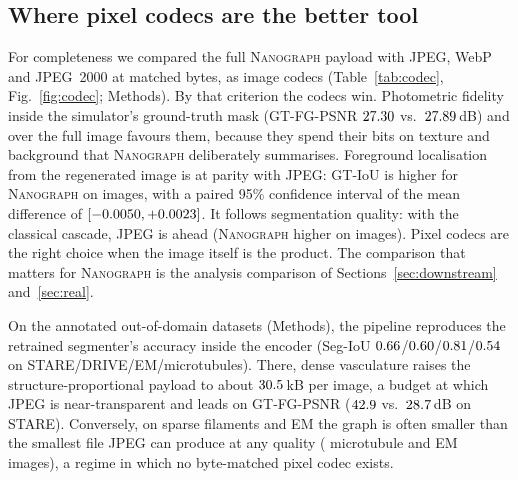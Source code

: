 \documentclass[10pt,a4paper]{article}
\newcommand{\method}{\textnormal{\textsc{Nanograph}}\xspace}
\begin{document}
\subsection{Where pixel codecs are the better tool}
\label{sec:codec}
For completeness we compared the full \method payload with JPEG, WebP and
JPEG~2000 at matched bytes, as image codecs (Table~\ref{tab:codec},
Fig.~\ref{fig:codec}; Methods). By that criterion the codecs win. Photometric fidelity inside the
simulator's ground-truth mask (GT-FG-PSNR $27.30$ vs.\
$27.89$\,dB) and over the full image favours them, because they
spend their bits on texture and background that \method deliberately
summarises. Foreground localisation from the regenerated image is at parity
with JPEG: GT-IoU is higher for \method on \DGTIoUWins{} images, with a
paired 95\% confidence interval of the mean difference of $[-0.0050,+0.0023]$.
It follows segmentation quality: with the classical cascade, JPEG is ahead
(\method higher on \CGTIoUWins{} images). Pixel codecs are the right choice
when the image itself is the product. The comparison that matters for
\method is the analysis comparison of Sections~\ref{sec:downstream}
and~\ref{sec:real}.

On the annotated out-of-domain datasets (Methods), the pipeline reproduces
the retrained segmenter's accuracy inside the encoder (Seg-IoU
$0.66$/$0.60$/$0.81$/$0.54$ on
STARE/DRIVE/EM/microtubules). There, dense vasculature raises the
structure-proportional payload to about $30.5$\,kB per image, a
budget at which JPEG is near-transparent and leads on GT-FG-PSNR
($42.9$ vs.\ $28.7$\,dB on STARE). Conversely, on
sparse filaments and EM the graph is often smaller than the smallest file
JPEG can produce at any quality (\CgMtNoJpeg{} microtubule and
\CgEpflNoJpeg{} EM images), a regime in which no byte-matched pixel codec
exists.
\end{document}
